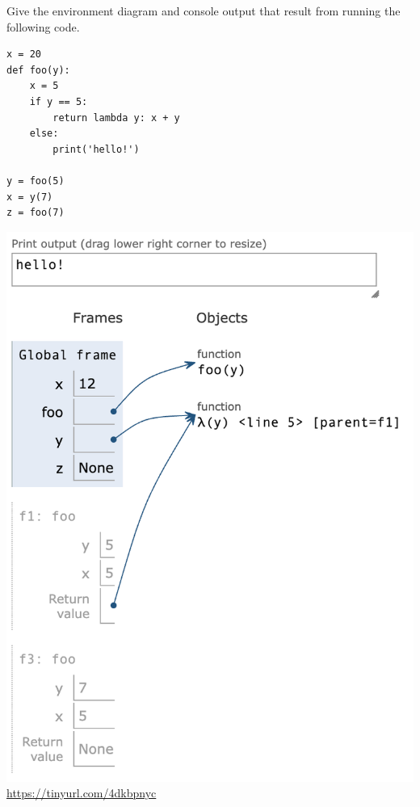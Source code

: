 \begin{blocksection}
\question Give the environment diagram and console output that result from running the following code.

\begin{lstlisting}
x = 20
def foo(y):
    x = 5
    if y == 5:
        return lambda y: x + y
    else:
        print('hello!')

y = foo(5)
x = y(7)
z = foo(7)
\end{lstlisting}

\begin{solution}[2in]
\includegraphics[scale=0.5]{foo.png}
\\
\url{https://tinyurl.com/4dkbpnyc}
\end{solution}
\end{blocksection}